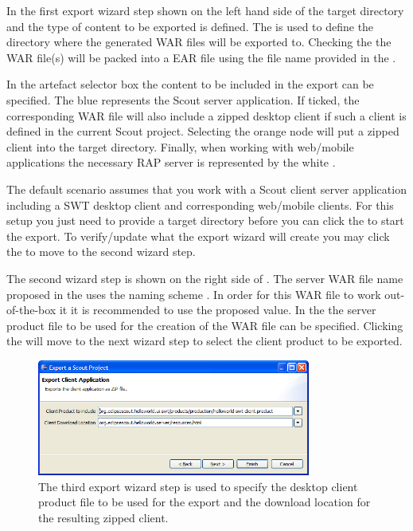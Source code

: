 \documentclass[a4paper,10pt,twoside]{book}
\begin{document}
In the first export wizard step shown on the left hand side of  the target directory and the type of content to be exported is defined. 
The  is used to define the directory where the generated WAR files will be exported to. 
Checking the  the WAR file(s) will be packed into a EAR file using the file name provided in the . 

In the artefact selector box the content to be included in the export can be specified. 
The blue  represents the Scout server application. 
If ticked, the corresponding WAR file will also include a zipped desktop client if such a client is defined in the current Scout project. 
Selecting the orange  node will put a zipped client into the target directory. 
Finally, when working with web/mobile applications the necessary RAP server is represented by the white . 

The default scenario assumes that you work with a Scout client server application including a SWT desktop client and corresponding web/mobile clients. 
For this setup you just need to provide a target directory before you can click the  to start the export. 
To verify/update what the export wizard will create you may click the  to move to the second wizard step.

The second wizard step is shown on the right side of . 
The server WAR file name proposed in the  uses the naming scheme . 
In order for this WAR file to work out-of-the-box it it is recommended to use the proposed value. 
In the  the server product file to be used for the creation of the WAR file can be specified. 
Clicking the  will move to the next wizard step to select the client product to be exported.

\begin{figure}
\includegraphics[width=9cm]{wizard_export_client_application.png}
\caption{The third export wizard step is used to specify the desktop client product file to be used for the export and the download location for the resulting zipped client.}
\end{figure}
\end{document}
